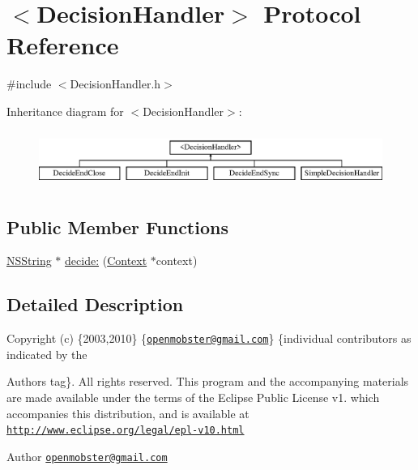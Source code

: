 \hypertarget{protocol_decision_handler-p}{
\section{$<$\-Decision\-Handler$>$ \-Protocol \-Reference}
\label{protocol_decision_handler-p}
}


{\ttfamily \#include $<$\-Decision\-Handler.\-h$>$}

\-Inheritance diagram for $<$\-Decision\-Handler$>$\-:\begin{figure}[H]
\begin{center}
\leavevmode
\includegraphics[height=1.854305cm]{protocol_decision_handler-p}
\end{center}
\end{figure}
\subsection*{\-Public \-Member \-Functions}
\begin{DoxyCompactItemize}
\item 
\hyperlink{class_n_s_string}{\-N\-S\-String} $\ast$ \hyperlink{protocol_decision_handler-p_a41f7c470703712a24aac7e4cd1f5e17b}{decide\-:} (\hyperlink{interface_context}{\-Context} $\ast$context)
\end{DoxyCompactItemize}


\subsection{\-Detailed \-Description}
\-Copyright (c) \{2003,2010\} \{\href{mailto:openmobster@gmail.com}{\tt openmobster@gmail.\-com}\} \{individual contributors as indicated by the \begin{DoxyAuthor}{\-Authors}
tag\}. \-All rights reserved. \-This program and the accompanying materials are made available under the terms of the \-Eclipse \-Public \-License v1. which accompanies this distribution, and is available at \href{http://www.eclipse.org/legal/epl-v10.html}{\tt http\-://www.\-eclipse.\-org/legal/epl-\/v10.\-html}
\end{DoxyAuthor}
\begin{DoxyAuthor}{\-Author}
\href{mailto:openmobster@gmail.com}{\tt openmobster@gmail.\-com} 
\end{DoxyAuthor}


